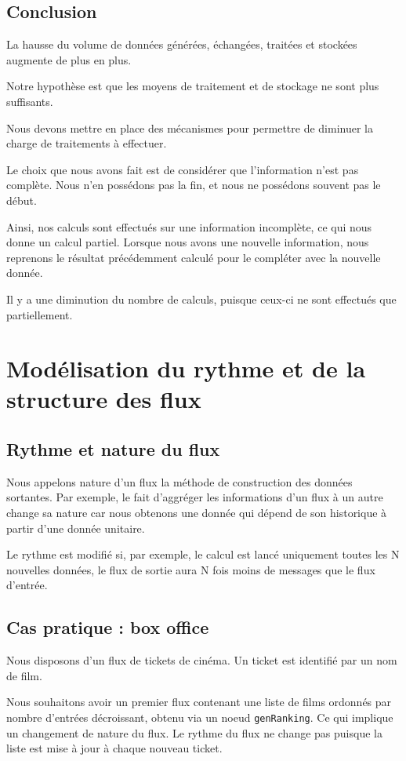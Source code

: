 \documentclass{llncs}
\begin{document}
\subsection{Conclusion}
La hausse du volume de données générées, échangées, traitées et stockées augmente de
plus en plus.

Notre hypothèse est que les moyens de traitement et de stockage ne sont plus
suffisants.

Nous devons mettre en place des mécanismes pour permettre de diminuer la charge
de traitements à effectuer.

Le choix que nous avons fait est de considérer que l'information n'est pas complète.
Nous n'en possédons pas la fin, et nous ne possédons souvent pas le début.

Ainsi, nos calculs sont effectués sur une information incomplète, ce qui nous
donne un calcul partiel.
Lorsque nous avons une nouvelle information, nous reprenons le résultat
précédemment calculé pour le compléter avec la nouvelle donnée.

Il y a une diminution du nombre de calculs, puisque ceux-ci ne sont effectués
que partiellement.

\section{Modélisation du rythme et de la structure des flux}
\subsection{Rythme et nature du flux}
Nous appelons nature d'un flux la méthode de construction des données sortantes.
Par exemple, le fait d'aggréger les informations d'un flux à un autre change
sa nature car nous obtenons une donnée qui dépend de son historique
à partir d'une donnée unitaire.

Le rythme est modifié si, par exemple, le calcul est lancé uniquement toutes les
N nouvelles données, le flux de sortie aura N fois moins de messages que le flux d'entrée.

\subsection{Cas pratique : box office}
Nous disposons d'un flux de tickets de cinéma.
Un ticket est identifié par un nom de film.

Nous souhaitons avoir un premier flux contenant une liste de films ordonnés par
nombre d'entrées décroissant, obtenu via un noeud \lstinline{genRanking}.
Ce qui implique un changement de nature du flux.
Le rythme du flux ne change pas puisque la liste est mise à jour à chaque nouveau
ticket.
\end{document}
